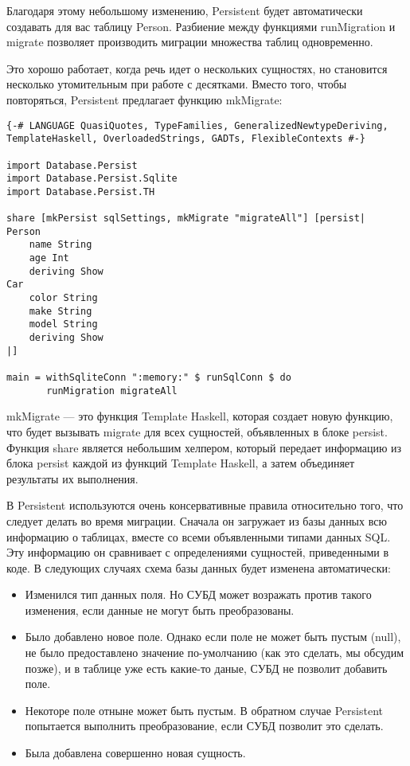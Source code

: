 Благодаря этому небольшому изменению, Persistent будет автоматически создавать для вас таблицу Person. Разбиение между функциями runMigration и migrate позволяет производить миграции множества таблиц одновременно.

Это хорошо работает, когда речь идет о нескольких сущностях, но становится несколько утомительным при работе с десятками. Вместо того, чтобы повторяться, Persistent предлагает функцию mkMigrate:

\begin{lstlisting}
{-# LANGUAGE QuasiQuotes, TypeFamilies, GeneralizedNewtypeDeriving, TemplateHaskell, OverloadedStrings, GADTs, FlexibleContexts #-}

import Database.Persist
import Database.Persist.Sqlite
import Database.Persist.TH

share [mkPersist sqlSettings, mkMigrate "migrateAll"] [persist|
Person
    name String
    age Int
    deriving Show
Car
    color String
    make String
    model String
    deriving Show
|]

main = withSqliteConn ":memory:" $ runSqlConn $ do
       runMigration migrateAll
\end{lstlisting}%

mkMigrate --- это функция Template Haskell, которая создает новую функцию, что будет вызывать migrate для всех сущностей, объявленных в блоке persist. Функция share является небольшим хелпером, который передает информацию из блока persist каждой из функций Template Haskell, а затем объединяет результаты их выполнения.

В Persistent используются очень консервативные правила относительно того, что следует делать во время миграции. Сначала он загружает из базы данных всю информацию о таблицах, вместе со всеми объявленными типами данных SQL. Эту информацию он сравнивает с определениями сущностей, приведенными в коде. В следующих случаях схема базы данных будет изменена автоматически:

\begin{itemize}
	\item Изменился тип данных поля. Но СУБД может возражать против такого изменения, если данные не могут быть преобразованы.
	\item Было добавлено новое поле. Однако если поле не может быть пустым (null), не было предоставлено значение по-умолчанию (как это сделать, мы обсудим позже), и в таблице уже есть какие-то даные, СУБД не позволит добавить поле.
	\item Некоторе поле отныне может быть пустым. В обратном случае Persistent попытается выполнить преобразование, если СУБД позволит это сделать.
	\item Была добавлена совершенно новая сущность.
\end{itemize}

